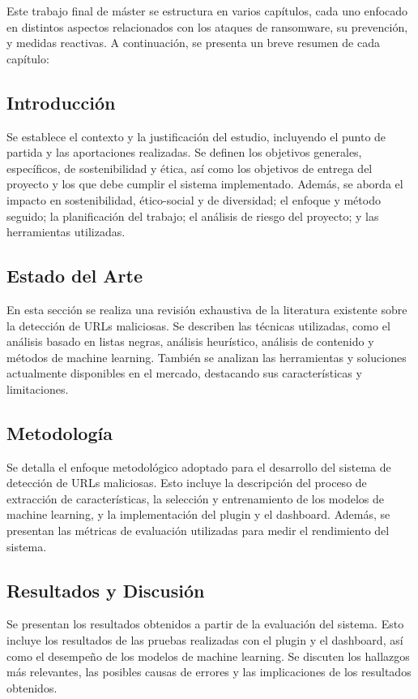 
Este trabajo final de máster se estructura en varios capítulos, cada uno enfocado en distintos aspectos relacionados con los ataques de ransomware, su prevención, y medidas reactivas. A continuación, se presenta un breve resumen de cada capítulo:\medskip

\subsection*{Introducción}
Se establece el contexto y la justificación del estudio, incluyendo el punto de partida y las aportaciones realizadas. Se definen los objetivos generales, específicos, de sostenibilidad y ética, así como los objetivos de entrega del proyecto y los que debe cumplir el sistema implementado. Además, se aborda el impacto en sostenibilidad, ético-social y de diversidad; el enfoque y método seguido; la planificación del trabajo; el análisis de riesgo del proyecto; y las herramientas utilizadas.

\subsection*{Estado del Arte}
En esta sección se realiza una revisión exhaustiva de la literatura existente sobre la detección de URLs maliciosas. Se describen las técnicas utilizadas, como el análisis basado en listas negras, análisis heurístico, análisis de contenido y métodos de machine learning. También se analizan las herramientas y soluciones actualmente disponibles en el mercado, destacando sus características y limitaciones.

\subsection*{Metodología}
Se detalla el enfoque metodológico adoptado para el desarrollo del sistema de detección de URLs maliciosas. Esto incluye la descripción del proceso de extracción de características, la selección y entrenamiento de los modelos de machine learning, y la implementación del plugin y el dashboard. Además, se presentan las métricas de evaluación utilizadas para medir el rendimiento del sistema.

\subsection*{Resultados y Discusión}
Se presentan los resultados obtenidos a partir de la evaluación del sistema. Esto incluye los resultados de las pruebas realizadas con el plugin y el dashboard, así como el desempeño de los modelos de machine learning. Se discuten los hallazgos más relevantes, las posibles causas de errores y las implicaciones de los resultados obtenidos.

